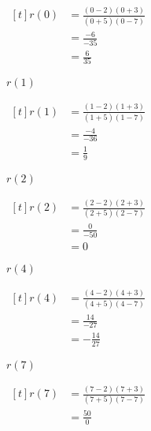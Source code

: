 \begin{exercises}
\begin{problem}
\begin{multicols}{4}
\begin{subproblem}
\begin{shortsolution}
 			$\begin{aligned}[t]
 				r(0) & =\frac{(0-2)(0+3)}{(0+5)(0-7)} \\
 				     & =\frac{-6}{-35}                \\
 				     & =\frac{6}{35}                  
 			\end{aligned}$
 		\end{shortsolution}
 	\end{subproblem}
 	\begin{subproblem}
 		$r(1)$ 
 		\begin{shortsolution}
 			$\begin{aligned}[t]
 				r(1) & =\frac{(1-2)(1+3)}{(1+5)(1-7)} \\
 				     & =\frac{-4}{-36}                \\
 				     & =\frac{1}{9}                   
 			\end{aligned}$
 		\end{shortsolution}
 	\end{subproblem}
 	\begin{subproblem}
 		$r(2)$ 
 		\begin{shortsolution}
 			$\begin{aligned}[t]
 				r(2) & =\frac{(2-2)(2+3)}{(2+5)(2-7)} \\
 				     & = \frac{0}{-50}                \\
 				     & =0                             
 			\end{aligned}$
 		\end{shortsolution}
 	\end{subproblem}
 	\begin{subproblem}
 		$r(4)$ 
 		\begin{shortsolution}
 			$\begin{aligned}[t]
 				r(4) & =\frac{(4-2)(4+3)}{(4+5)(4-7)} \\
 				     & =\frac{14}{-27}                \\
 				     & =-\frac{14}{27}                
 			\end{aligned}$
 		\end{shortsolution}
 	\end{subproblem}
 	\begin{subproblem}
 		$r(7)$ 
 		\begin{shortsolution}
 			$\begin{aligned}[t]
 				r(7) & =\frac{(7-2)(7+3)}{(7+5)(7-7)} \\
 				     & =\frac{50}{0}                  
 			\end{aligned}$
 			 				 			 			         

\end{shortsolution}
\end{subproblem}
\end{multicols}
\end{problem}
\end{exercises}
